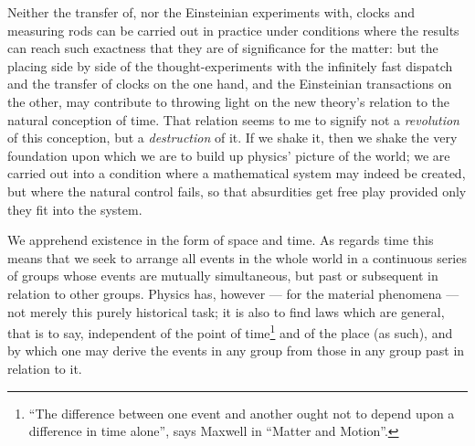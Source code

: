 \documentclass[12pt,a4paper]{article}
\begin{document}
Neither the transfer of, nor the Einsteinian experiments with, clocks and
measuring rods can be carried out in practice under conditions where the
results can reach such exactness that they are of significance for the matter:
but the placing side by side of the thought-experiments with the infinitely
fast dispatch and the transfer of clocks on the one hand, and the Einsteinian
transactions on the other, may contribute to throwing light on the new
theory's relation to the natural conception of time. That relation
seems to me to signify not a \emph{revolution} of this conception, but a
\emph{destruction} of it. If we shake it, then we shake the very foundation
upon which we are to build up physics' picture of the world; we are carried
out into a condition where a mathematical system may indeed be created, but
where the natural control fails, so that absurdities get free play provided
only they fit into the system.

We apprehend existence in the form of space and time. As regards time this
means that we seek to arrange all events in the whole world in a continuous
series of groups whose events are mutually simultaneous, but past or
subsequent in relation to other groups. Physics has, however --- for the
material phenomena --- not merely this purely historical task; it is also to
find laws which are general, that is to say, independent of the point of
time\footnote{``The difference between one event and another ought not to
depend upon a difference in time alone'', says Maxwell in ``Matter and
Motion''.} and of the place (as such), and by which one may derive the events
in any group from those in any group past in relation to it.
\end{document}
